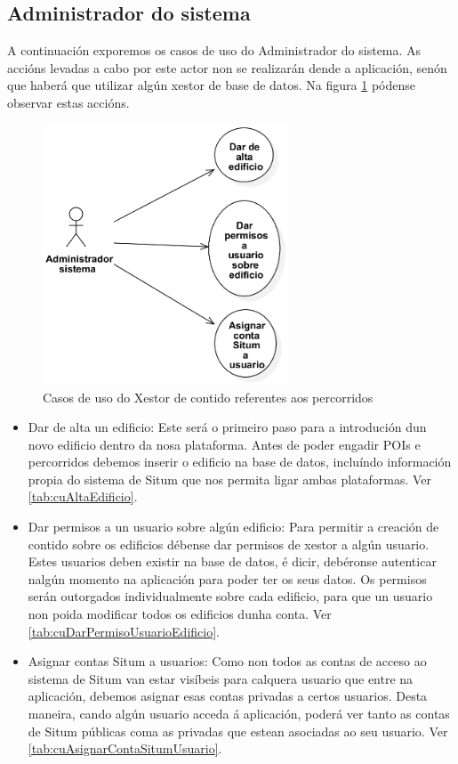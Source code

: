 \subsection{Administrador do sistema}
A continuación exporemos os casos de uso do Administrador do sistema. As accións levadas a cabo por este actor non se realizarán dende a aplicación, senón que haberá que utilizar algún xestor de base de datos. Na figura \ref{fig:cuAdministradorSistema} pódense observar estas accións.

\begin{figure}[tbp]
	\begin{center}
		\includegraphics[width=0.65\textwidth]{figures/CasosUso/AdministradorSistema}
		\caption{Casos de uso do Xestor de contido referentes aos percorridos}
		\label{fig:cuAdministradorSistema}
	\end{center}
\end{figure}

\begin{itemize}
	\item Dar de alta un edificio: Este será o primeiro paso para a introdución dun novo edificio dentro da nosa plataforma. Antes de poder engadir POIs e percorridos debemos inserir o edificio na base de datos, incluíndo información propia do sistema de Situm que nos permita ligar ambas plataformas. Ver \ref{tab:cuAltaEdificio}.
	\item Dar permisos a un usuario sobre algún edificio: Para permitir a creación de contido sobre os edificios débense dar permisos de xestor a algún usuario. Estes usuarios deben existir na base de datos, é dicir, debéronse autenticar nalgún momento na aplicación para poder ter os seus datos. Os permisos serán outorgados individualmente sobre cada edificio, para que un usuario non poida modificar todos os edificios dunha conta. Ver \ref{tab:cuDarPermisoUsuarioEdificio}.
	\item Asignar contas Situm a usuarios: Como non todos as contas de acceso ao sistema de Situm van estar visíbeis para calquera usuario que entre na aplicación, debemos asignar esas contas privadas a certos usuarios. Desta maneira, cando algún usuario acceda á aplicación, poderá ver tanto as contas de Situm públicas coma as privadas que estean asociadas ao seu usuario. Ver \ref{tab:cuAsignarContaSitumUsuario}.
\end{itemize}